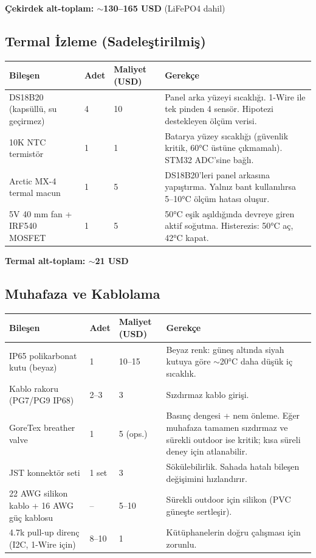 \documentclass[11pt,a4paper]{article}
\begin{document}
\textbf{Çekirdek alt-toplam: $\sim$130--165 USD} (LiFePO4 dahil)

\subsection{Termal İzleme (Sadeleştirilmiş)}

\begin{longtable}{|p{4.5cm}|p{1.3cm}|p{1.5cm}|p{6cm}|}
\hline
\rowcolor{primary!15}
\textbf{Bileşen} & \textbf{Adet} & \textbf{Maliyet (USD)} & \textbf{Gerekçe} \\
\hline
\endhead

DS18B20 (kapsüllü, su geçirmez) & 4 & 10 & Panel arka yüzeyi sıcaklığı. 1-Wire ile tek pinden 4 sensör. Hipotezi destekleyen ölçüm verisi. \\
\hline
10K NTC termistör & 1 & 1 & Batarya yüzey sıcaklığı (güvenlik kritik, 60°C üstüne çıkmamalı). STM32 ADC'sine bağlı. \\
\hline
Arctic MX-4 termal macun & 1 & 5 & DS18B20'leri panel arkasına yapıştırma. Yalnız bant kullanılırsa 5--10°C ölçüm hatası oluşur. \\
\hline
5V 40 mm fan + IRF540 MOSFET & 1 & 5 & 50°C eşik aşıldığında devreye giren aktif soğutma. Histerezis: 50°C aç, 42°C kapat. \\
\hline
\end{longtable}

\textbf{Termal alt-toplam: $\sim$21 USD}

\subsection{Muhafaza ve Kablolama}

\begin{longtable}{|p{4.5cm}|p{1.3cm}|p{1.5cm}|p{6cm}|}
\hline
\rowcolor{primary!15}
\textbf{Bileşen} & \textbf{Adet} & \textbf{Maliyet (USD)} & \textbf{Gerekçe} \\
\hline
\endhead

IP65 polikarbonat kutu (beyaz) & 1 & 10--15 & Beyaz renk: güneş altında siyah kutuya göre $\sim$20°C daha düşük iç sıcaklık. \\
\hline
Kablo rakoru (PG7/PG9 IP68) & 2--3 & 3 & Sızdırmaz kablo girişi. \\
\hline
GoreTex breather valve & 1 & 5 (ops.) & Basınç dengesi + nem önleme. Eğer muhafaza tamamen sızdırmaz ve sürekli outdoor ise kritik; kısa süreli deney için atlanabilir. \\
\hline
JST konnektör seti & 1 set & 3 & Sökülebilirlik. Sahada hatalı bileşen değişimini hızlandırır. \\
\hline
22 AWG silikon kablo + 16 AWG güç kablosu & -- & 5--10 & Sürekli outdoor için silikon (PVC güneşte sertleşir). \\
\hline
4.7k pull-up direnç (I2C, 1-Wire için) & 8--10 & 1 & Kütüphanelerin doğru çalışması için zorunlu. \\
\hline
\end{longtable}
\end{document}

